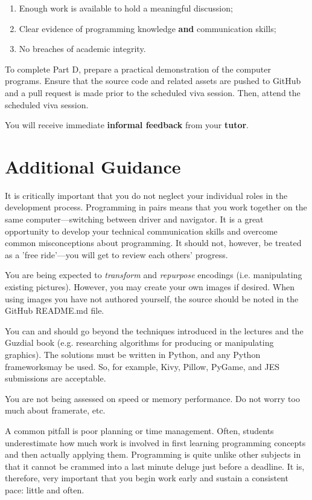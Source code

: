 \documentclass{../fal_assignment}
\begin{document}
\begin{enumerate}[label=(\alph*)]
	\item Enough work is available to hold a meaningful discussion;
	\item Clear evidence of programming knowledge \textbf{and} communication skills;
	\item No breaches of academic integrity.
\end{enumerate}

To complete Part D, prepare a practical demonstration of the computer programs. Ensure that the source code and related assets are pushed to GitHub and a pull request is made prior to the scheduled viva session. Then, attend the scheduled viva session.

You will receive immediate \textbf{informal feedback} from your \textbf{tutor}.

\section*{Additional Guidance}

It is critically important that you do not neglect your individual roles in the development process. Programming in pairs means that you work together on the same computer---switching between driver and navigator. It is a great opportunity to develop your technical communication skills and overcome common misconceptions about programming. It should not, however, be treated as a 'free ride'---you will get to review each others' progress. 

You are being expected to \textit{transform} and \textit{repurpose} encodings (i.e. manipulating existing pictures). However, you may create your own images if desired. When using images you have not authored yourself, the source should be noted in the GitHub README.md file. 

You can and should go beyond the techniques introduced in the lectures and the Guzdial book (e.g. researching algorithms for producing or manipulating graphics). The solutions must be written in Python, and any Python frameworksmay be used. So, for example, Kivy, Pillow, PyGame, and JES submissions are acceptable.

You are not being assessed on speed or memory performance. Do not worry too much about framerate, etc.

A common pitfall is poor planning or time management. Often, students underestimate how much work is involved in first learning programming concepts and then actually applying them. Programming is quite unlike other subjects in that it cannot be crammed into a last minute deluge just before a deadline. It is, therefore, very important that you begin work early and sustain a consistent pace: little and often.
\end{document}
